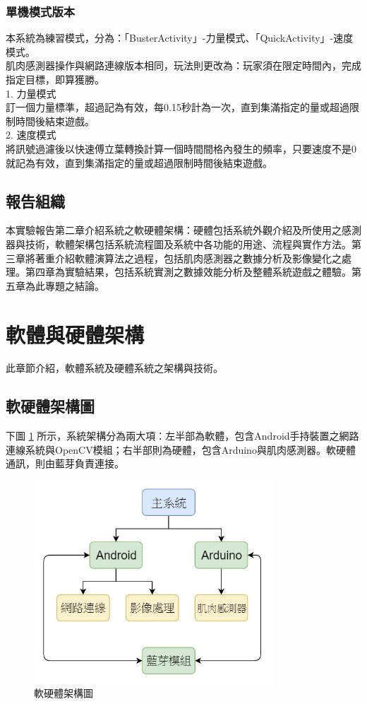 \documentclass[12pt]{article}  %
\theoremstyle{plain}
\begin{document}
\subsubsection{單機模式版本}
本系統為練習模式，分為：「BusterActivity」-力量模式、「QuickActivity」-速度模式。\\
\indent 肌肉感測器操作與網路連線版本相同，玩法則更改為：玩家須在限定時間內，完成指定目標，即算獲勝。\\
1. 力量模式 \\
\indent 訂一個力量標準，超過記為有效，每0.15秒計為一次，直到集滿指定的量或超過限制時間後結束遊戲。\\
2. 速度模式 \\
\indent 將訊號過濾後以快速傅立葉轉換計算一個時間間格內發生的頻率，只要速度不是0就記為有效，直到集滿指定的量或超過限制時間後結束遊戲。\\

\subsection{報告組織}
本實驗報告第二章介紹系統之軟硬體架構：硬體包括系統外觀介紹及所使用之感測器與技術，軟體架構包括系統流程圖及系統中各功能的用途、流程與實作方法。第三章將著重介紹軟體演算法之過程，包括肌肉感測器之數據分析及影像變化之處理。第四章為實驗結果，包括系統實測之數據效能分析及整體系統遊戲之體驗。第五章為此專題之結論。\\
\newpage

\section{軟體與硬體架構}
此章節介紹，軟體系統及硬體系統之架構與技術。

\subsection{軟硬體架構圖}
下圖 \ref{軟硬體架構圖} 所示，系統架構分為兩大項：左半部為軟體，包含Android手持裝置之網路連線系統與OpenCV模組；右半部則為硬體，包含Arduino與肌肉感測器。軟硬體通訊，則由藍芽負責連接。
\begin{figure}[h]  %
\centering
\includegraphics[width=9cm]{pic/ch2/軟硬體架構圖.JPG}
\caption{軟硬體架構圖} \label{軟硬體架構圖}
\end{figure}
\end{document}
